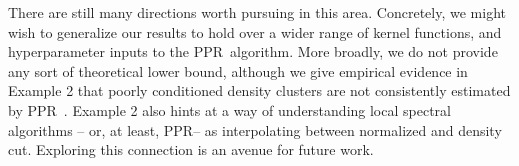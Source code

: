 \documentclass{article}
\newcommand{\1}{\mathbf{1}}
\newcommand{\ppr}{{\sc PPR}}
\newcommand{\pprspace}{{\sc PPR~}}
\theoremstyle{aldenthm}
\theoremstyle{aldenrmrk}
\begin{document}
There are still many directions worth pursuing in this area. Concretely, we might wish to generalize our results to hold over a wider range of kernel functions, and hyperparameter inputs to the \pprspace algorithm. More broadly, we do not provide any sort of theoretical lower bound, although we give empirical evidence in Example 2 that poorly conditioned density clusters are not consistently estimated by \pprspace. Example 2 also hints at a way of understanding local spectral algorithms -- or, at least, \ppr-- as interpolating between normalized and density cut. Exploring this connection is an avenue for future work.

\clearpage



\end{document}
